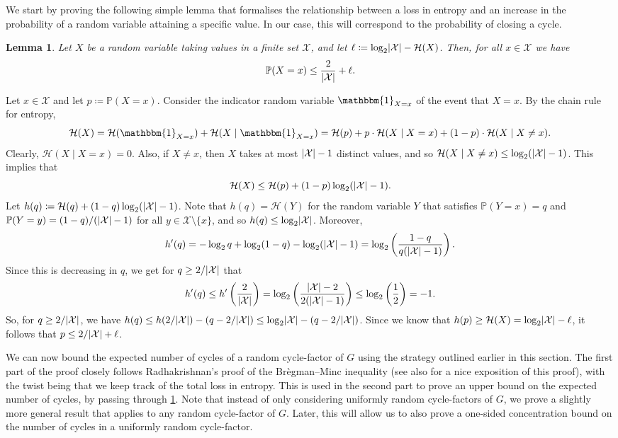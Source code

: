 \documentclass[11pt]{article}
\makeatletter
\theoremstyle{plain}
\newtheorem{lemma}[theorem]{Lemma}
\theoremstyle{definition}
\renewenvironment{proof}[1][\proofname]
{\par\pushQED{\qed}
	\normalfont\topsep6\p@\@plus6\p@\relax\trivlist
	\item[\hskip\labelsep\bfseries#1\@addpunct{.}]
	\ignorespaces}
{\popQED\endtrivlist\@endpefalse}
\newcommand{\pr}{\mathbb{P}}
\newcommand{\ent}{\mathcal{H}}
\newcommand{\ind}{\mathbbm{1}}
\newcommand{\X}{\mathcal X}
\newcommand{\logt}{\log_2}
\DeclarePairedDelimiter{\abs}{\lvert}{\rvert}
\makeatother
\begin{document}
We start by proving the following simple lemma that formalises the relationship between a loss in entropy and an increase in the probability of a random variable attaining a specific value. In our case, this will correspond to the probability of closing a cycle.

\begin{lemma}\label{lem:entlossskew}
    Let $X$ be a random variable taking values in a finite set $\X$, and let $\ell \coloneqq \logt \abs{\X} - \ent(X)$. Then, for all $x \in \X$ we have
    \[
        \pr(X = x) \le \frac{2}{\abs{\X}} + \ell.
    \]
\end{lemma}

\begin{proof}
    Let $x \in \X$ and let $p \coloneqq \pr(X = x)$. Consider the indicator random variable $\ind_{X = x}$ of the event that $X = x$. By the chain rule for entropy,
    \[
        \ent(X) = \ent(\ind_{X = x}) + \ent(X \mid \ind_{X = x}) = \ent(p) + p \cdot \ent(X \mid X = x) + (1-p) \cdot \ent(X \mid X \neq x).
    \]
    Clearly, $\ent(X \mid X = x) = 0$. Also, if $X \neq x$, then $X$ takes at most $\abs{\X}-1$ distinct values, and so $\ent(X \mid X \neq x) \le \logt(\abs{\X}-1)$. This implies that
    \[
        \ent(X) \le \ent(p) + (1-p) \logt(\abs{\X}-1).
    \]
    Let $h(q) \coloneqq \ent(q) + (1-q) \logt(\abs{\X}-1)$. Note that $h(q) = \ent(Y)$ for the random variable $Y$ that satisfies $\pr(Y = x) = q$ and $\pr(Y = y) = (1-q)/(\abs{\X}-1)$ for all $y \in \X \setminus \{x\}$, and so $h(q) \le \logt \abs{\X}$. Moreover,
    \[
        h'(q) = - \logt q + \logt(1-q) - \logt(\abs{\X}-1) = \logt\left(\frac{1-q}{q (\abs{\X}-1)}\right).
    \]
    Since this is decreasing in $q$, we get for $q \ge 2/\abs{\X}$ that
    \[
        h'(q) \le h'\left(\frac{2}{\abs{\X}}\right) = \logt\left(\frac{\abs{\X}-2}{2 (\abs{\X}-1)}\right) \le \logt\left(\frac{1}{2}\right) = -1.
    \]
    So, for $q \ge 2/\abs{\X}$, we have $h(q) \le h(2/\abs{\X}) - (q - 2/\abs{\X}) \le \logt \abs{\X} - (q - 2/\abs{\X})$. Since we know that $h(p) \ge \ent(X) = \logt \abs{\X} - \ell$, it follows that $p \le 2/\abs{\X} + \ell$.
\end{proof}

We can now bound the expected number of cycles of a random cycle-factor of $G$ using the strategy outlined earlier in this section. The first part of the proof closely follows Radhakrishnan's proof of the Br\`{e}gman--Minc inequality (see also \cite[Chapter 37]{aigner1999proofs} for a nice exposition of this proof), with the twist being that we keep track of the total loss in entropy. This is used in the second part to prove an upper bound on the expected number of cycles, by passing through \cref{lem:entlossskew}. Note that instead of only considering uniformly random cycle-factors of $G$, we prove a slightly more general result that applies to any random cycle-factor of $G$. Later, this will allow us to also prove a one-sided concentration bound on the number of cycles in a uniformly random cycle-factor.
\end{document}
